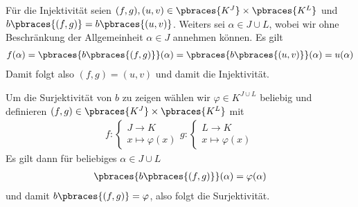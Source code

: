 \begin{solution}
    Für die Injektivität seien $(f,g), (u,v) \in \pbraces{K^J} \times \pbraces{K^L}$ und $b\pbraces{(f,g)} = b\pbraces{(u,v)}$. Weiters sei $\alpha \in J \cup L$, wobei wir ohne Beschränkung der Allgemeinheit $\alpha \in J$ annehmen können. Es gilt
    \begin{align*}
        f(\alpha) = \pbraces{b\pbraces{(f,g)}}(\alpha) = \pbraces{b\pbraces{(u,v)}}(\alpha) = u(\alpha)
    \end{align*}
    Damit folgt also $(f,g) = (u,v)$ und damit die Injektivität.

    Um die Surjektivität von $b$ zu zeigen wählen wir $\varphi \in K^{J \cup L}$ beliebig und definieren $(f,g) \in \pbraces{K^J} \times \pbraces{K^L}$ mit
    \begin{align*}
    f: \begin{cases}
        J \to K \\
        x \mapsto \varphi(x)
        \end{cases}
    g: \begin{cases}
        L \to K \\
        x \mapsto \varphi(x)
        \end{cases}
    \end{align*}
    Es gilt dann für beliebiges $\alpha \in J \cup L$
    \begin{align*}
        \pbraces{b\pbraces{(f,g)}}(\alpha) = \varphi(\alpha)
    \end{align*}
    und damit $b\pbraces{(f,g)} = \varphi$, also folgt die Surjektivität.
\end{solution}
